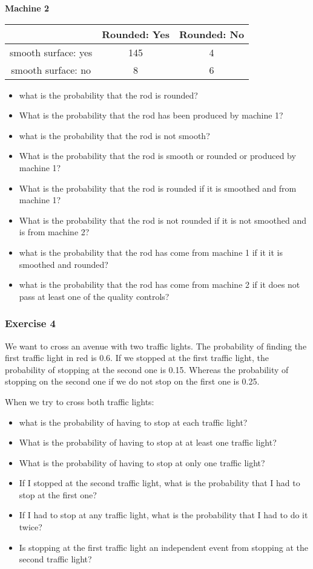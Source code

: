 \documentclass[
]{book}
\providecommand{\tightlist}{%
  \setlength{\itemsep}{0pt}\setlength{\parskip}{0pt}}
\begin{document}
\textbf{Machine 2}

\begin{longtable}[]{@{}ccc@{}}
\toprule
& Rounded: Yes & Rounded: No \\
\midrule
\endhead
smooth surface: yes & 145 & 4 \\
smooth surface: no & 8 & 6 \\
\bottomrule
\end{longtable}

\begin{itemize}
\tightlist
\item
  what is the probability that the rod is rounded?
\item
  What is the probability that the rod has been produced by machine 1?
\item
  what is the probability that the rod is not smooth?
\item
  What is the probability that the rod is smooth or rounded or produced by machine 1?
\item
  What is the probability that the rod is rounded if it is smoothed and from machine 1?
\item
  What is the probability that the rod is not rounded if it is not smoothed and is from machine 2?
\item
  what is the probability that the rod has come from machine 1 if it it is smoothed and rounded?
\item
  what is the probability that the rod has come from machine 2 if it does not pass at least one of the quality controls?
\end{itemize}

\hypertarget{exercise-4}{%
\subsubsection{Exercise 4}\label{exercise-4}}

We want to cross an avenue with two traffic lights. The probability of finding the first traffic light in red is 0.6. If we stopped at the first traffic light, the probability of stopping at the second one is 0.15. Whereas the probability of stopping on the second one if we do not stop on the first one is 0.25.

When we try to cross both traffic lights:

\begin{itemize}
\tightlist
\item
  what is the probability of having to stop at each traffic light?
\item
  What is the probability of having to stop at at least one traffic light?
\item
  What is the probability of having to stop at only one traffic light?
\item
  If I stopped at the second traffic light, what is the probability that I had to stop at the first one?\\
\item
  If I had to stop at any traffic light, what is the probability that I had to do it twice?
\item
  Is stopping at the first traffic light an independent event from stopping at the second traffic light?
\end{itemize}
\end{document}
